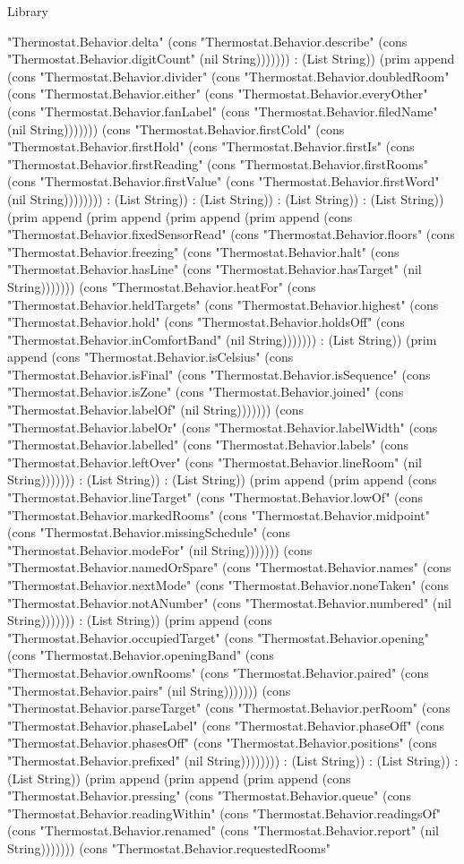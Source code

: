 \begin{lexlean}{Library}
\begin{semanticmodule}
{"Thermostat.Behavior.delta" (cons "Thermostat.Behavior.describe" (cons "Thermostat.Behavior.digitCount" (nil String))))))) : (List String)) (prim append (cons "Thermostat.Behavior.divider" (cons "Thermostat.Behavior.doubledRoom" (cons "Thermostat.Behavior.either" (cons "Thermostat.Behavior.everyOther" (cons "Thermostat.Behavior.fanLabel" (cons "Thermostat.Behavior.filedName" (nil String))))))) (cons "Thermostat.Behavior.firstCold" (cons "Thermostat.Behavior.firstHold" (cons "Thermostat.Behavior.firstIs" (cons "Thermostat.Behavior.firstReading" (cons "Thermostat.Behavior.firstRooms" (cons "Thermostat.Behavior.firstValue" (cons "Thermostat.Behavior.firstWord" (nil String)))))))) : (List String)) : (List String)) : (List String)) : (List String)) (prim append (prim append (prim append (prim append (cons "Thermostat.Behavior.fixedSensorRead" (cons "Thermostat.Behavior.floors" (cons "Thermostat.Behavior.freezing" (cons "Thermostat.Behavior.halt" (cons "Thermostat.Behavior.hasLine" (cons "Thermostat.Behavior.hasTarget" (nil String))))))) (cons "Thermostat.Behavior.heatFor" (cons "Thermostat.Behavior.heldTargets" (cons "Thermostat.Behavior.highest" (cons "Thermostat.Behavior.hold" (cons "Thermostat.Behavior.holdsOff" (cons "Thermostat.Behavior.inComfortBand" (nil String))))))) : (List String)) (prim append (cons "Thermostat.Behavior.isCelsius" (cons "Thermostat.Behavior.isFinal" (cons "Thermostat.Behavior.isSequence" (cons "Thermostat.Behavior.isZone" (cons "Thermostat.Behavior.joined" (cons "Thermostat.Behavior.labelOf" (nil String))))))) (cons "Thermostat.Behavior.labelOr" (cons "Thermostat.Behavior.labelWidth" (cons "Thermostat.Behavior.labelled" (cons "Thermostat.Behavior.labels" (cons "Thermostat.Behavior.leftOver" (cons "Thermostat.Behavior.lineRoom" (nil String))))))) : (List String)) : (List String)) (prim append (prim append (cons "Thermostat.Behavior.lineTarget" (cons "Thermostat.Behavior.lowOf" (cons "Thermostat.Behavior.markedRooms" (cons "Thermostat.Behavior.midpoint" (cons "Thermostat.Behavior.missingSchedule" (cons "Thermostat.Behavior.modeFor" (nil String))))))) (cons "Thermostat.Behavior.namedOrSpare" (cons "Thermostat.Behavior.names" (cons "Thermostat.Behavior.nextMode" (cons "Thermostat.Behavior.noneTaken" (cons "Thermostat.Behavior.notANumber" (cons "Thermostat.Behavior.numbered" (nil String))))))) : (List String)) (prim append (cons "Thermostat.Behavior.occupiedTarget" (cons "Thermostat.Behavior.opening" (cons "Thermostat.Behavior.openingBand" (cons "Thermostat.Behavior.ownRooms" (cons "Thermostat.Behavior.paired" (cons "Thermostat.Behavior.pairs" (nil String))))))) (cons "Thermostat.Behavior.parseTarget" (cons "Thermostat.Behavior.perRoom" (cons "Thermostat.Behavior.phaseLabel" (cons "Thermostat.Behavior.phaseOff" (cons "Thermostat.Behavior.phasesOff" (cons "Thermostat.Behavior.positions" (cons "Thermostat.Behavior.prefixed" (nil String)))))))) : (List String)) : (List String)) : (List String)) (prim append (prim append (prim append (cons "Thermostat.Behavior.pressing" (cons "Thermostat.Behavior.queue" (cons "Thermostat.Behavior.readingWithin" (cons "Thermostat.Behavior.readingsOf" (cons "Thermostat.Behavior.renamed" (cons "Thermostat.Behavior.report" (nil String))))))) (cons "Thermostat.Behavior.requestedRooms" }
\end{semanticmodule}
\end{lexlean}
